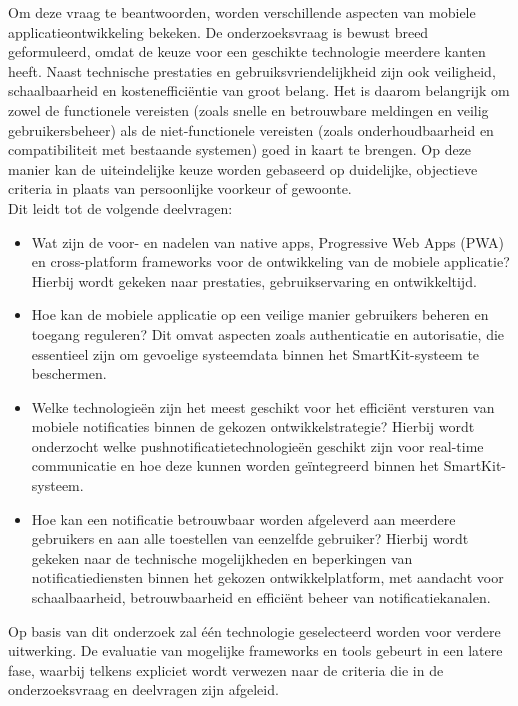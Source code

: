 \noindent Om deze vraag te beantwoorden, worden verschillende aspecten van mobiele applicatieontwikkeling bekeken. De onderzoeksvraag is bewust breed geformuleerd, omdat de keuze voor een geschikte technologie meerdere kanten heeft. Naast technische prestaties en gebruiksvriendelijkheid zijn ook veiligheid, schaalbaarheid en kostenefficiëntie van groot belang. Het is daarom belangrijk om zowel de functionele vereisten (zoals snelle en betrouwbare meldingen en veilig gebruikersbeheer) als de niet-functionele vereisten (zoals onderhoudbaarheid en compatibiliteit met bestaande systemen) goed in kaart te brengen. Op deze manier kan de uiteindelijke keuze worden gebaseerd op duidelijke, objectieve criteria in plaats van persoonlijke voorkeur of gewoonte.\\

Dit leidt tot de volgende deelvragen:

\begin{itemize}
	\item Wat zijn de voor- en nadelen van native apps, Progressive Web Apps (PWA) en cross-platform frameworks voor de ontwikkeling van de mobiele applicatie? Hierbij wordt gekeken naar prestaties, gebruikservaring en ontwikkeltijd.
	
	\item Hoe kan de mobiele applicatie op een veilige manier gebruikers beheren en toegang reguleren? Dit omvat aspecten zoals authenticatie en autorisatie, die essentieel zijn om gevoelige systeemdata binnen het SmartKit-systeem te beschermen.
	
	\item Welke technologieën zijn het meest geschikt voor het efficiënt versturen van mobiele notificaties binnen de gekozen ontwikkelstrategie? Hierbij wordt onderzocht welke pushnotificatietechnologieën geschikt zijn voor real-time communicatie en hoe deze kunnen worden geïntegreerd binnen het SmartKit-systeem.
	
	\item Hoe kan een notificatie betrouwbaar worden afgeleverd aan meerdere gebruikers en aan alle toestellen van eenzelfde gebruiker? Hierbij wordt gekeken naar de technische mogelijkheden en beperkingen van notificatiediensten binnen het gekozen ontwikkelplatform, met aandacht voor schaalbaarheid, betrouwbaarheid en efficiënt beheer van notificatiekanalen.
\end{itemize}

\noindent
Op basis van dit onderzoek zal één technologie geselecteerd worden voor verdere uitwerking. De evaluatie van mogelijke frameworks en tools gebeurt in een latere fase, waarbij telkens expliciet wordt verwezen naar de criteria die in de onderzoeksvraag en deelvragen zijn afgeleid.



